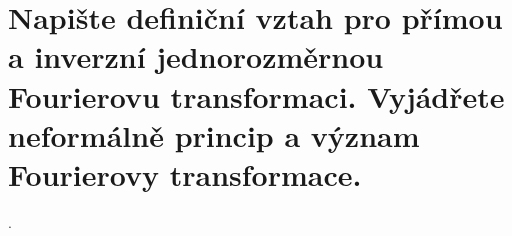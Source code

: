 \section{Napište definiční vztah pro přímou a inverzní jednorozměrnou Fourierovu transformaci. Vyjádřete neformálně 
princip a význam Fourierovy transformace.}.